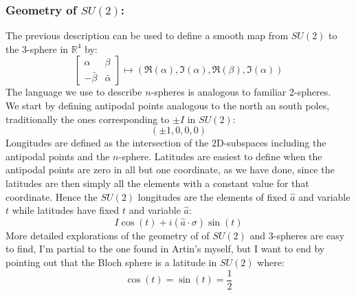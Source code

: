 \subsubsection{Geometry of $SU(2)$:}
The previous description can be used to define a smooth map from $SU(2)$ to the $3$-sphere in $\mathbb{R}^4$ by:
\[\begin{bmatrix} \alpha& \beta\\-\bar{\beta}&\bar{\alpha}\end{bmatrix}\mapsto (\Re(\alpha),\Im(\alpha),\Re(\beta),\Im(\alpha))\]
The language we use to describe $n$-spheres is analogous to familiar $2$-spheres.
\\

We start by defining antipodal points analogous to the north an south poles,
traditionally the ones corresponding to $\pm I$ in $SU(2)$:
\[(\pm1,0,0,0)\]
Longitudes are defined as the intersection of the  $2$D-subspaces including the antipodal points and the $n$-sphere.
Latitudes are easiest to define when the antipodal points are zero in all but one coordinate,
as we have done,
since the latitudes are then simply all the elements with a constant value for that coordinate.
Hence the $SU(2)$ longitudes are the elements of fixed $\hat{a}$ and variable $t$ while latitudes have fixed $t$ and variable $\hat{a}$:
\[I\cos(t)+i(\hat{a}\cdot\sigma)\sin(t)\]
More detailed explorations of the geometry of of $SU(2)$ and $3$-spheres are easy to find,
I'm partial to the one found in Artin's myself,
but I want to end by pointing out that the Bloch sphere is a latitude in $SU(2)$ where:
\[\cos(t)=\sin(t)= \frac{1}{2}\]

